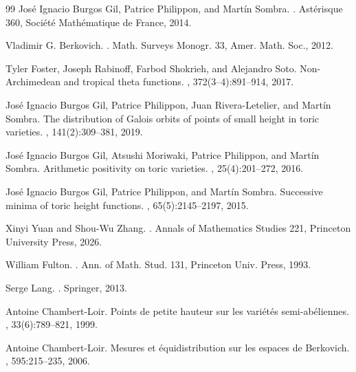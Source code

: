 \documentclass[10pt,a4paper]{amsart}
\theoremstyle{plain}
\theoremstyle{plain}
\numberwithin{equation}{section}
\begin{document}
\begin{thebibliography}{99}
		Jos{\'e} Ignacio Burgos Gil, Patrice Philippon, and Mart\'in Sombra.
		.
		\newblock Ast\'erisque 360, Soci\'et\'e Math\'ematique de France, 2014.
		
		Vladimir G. Berkovich.
		.
		\newblock Math. Surveys Monogr. 33, Amer. Math. Soc., 2012.
		
		Tyler Foster, Joseph Rabinoff, Farbod Shokrieh, and Alejandro Soto.
		\newblock Non-Archimedean and tropical theta functions.
		, 372(3--4):891--914, 2017.
		
		Jos{\'e} Ignacio Burgos Gil, Patrice Philippon, Juan Rivera-Letelier, and Mart\'in Sombra.
		\newblock The distribution of Galois orbits of points of small height in toric varieties.
		, 141(2):309--381, 2019.
		
		Jos{\'e} Ignacio Burgos Gil, Atsushi Moriwaki, Patrice Philippon, and Mart\'in Sombra.
		\newblock Arithmetic positivity on toric varieties.
		, 25(4):201--272, 2016.
		
		Jos{\'e} Ignacio Burgos Gil, Patrice Philippon, and Mart\'in Sombra.
		\newblock Successive minima of toric height functions.
		, 65(5):2145--2197, 2015.
		
		Xinyi Yuan and Shou-Wu Zhang.
		.
		\newblock Annals of Mathematics Studies 221, Princeton University Press, 2026.
		
		William Fulton.
		.
		\newblock Ann. of Math. Stud. 131, Princeton Univ. Press, 1993.
		
		Serge Lang.
		.
		\newblock Springer, 2013.
		
		Antoine Chambert-Loir.
		\newblock Points de petite hauteur sur les vari\'et\'es semi-ab\'eliennes.
		, 33(6):789--821, 1999.
		
		Antoine Chambert-Loir.
		\newblock Mesures et \'equidistribution sur les espaces de Berkovich.
		, 595:215--235, 2006.
		

\end{thebibliography}
\end{document}

